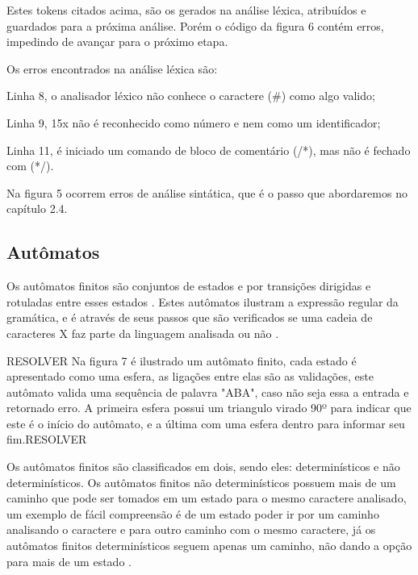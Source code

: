 \documentclass[12pt,oneside,a4paper,chapter=TITLE,section=TITLE,sumario=tradicional]{abntex2}
\begin{document}
Estes tokens citados acima, são os gerados na análise léxica, atribuídos e guardados para a próxima análise. Porém o código da figura 6 contém erros, impedindo de avançar para o próximo etapa.

Os erros encontrados na análise léxica são:

\begin{lista}
	\item Linha 8, o analisador léxico não conhece o caractere (\#) como algo valido;
	\item Linha 9, 15x não é reconhecido como número e nem como um identificador;
	\item Linha 11, é iniciado um comando de bloco de comentário (/*), mas não é fechado com (*/).
\end{lista}

Na figura 5 ocorrem erros de análise sintática, que é o passo que abordaremos no capítulo 2.4.

\subsection{Autômatos}
\label{sec:automatos}

Os autômatos finitos são conjuntos de estados e por transições dirigidas e rotuladas entre esses estados \cite{pedro2018}. Estes autômatos ilustram a expressão regular da gramática, e é através de seus passos que são verificados se uma cadeia de caracteres X faz parte da linguagem analisada ou não \cite{alfred1995}.

RESOLVER
Na figura 7 é ilustrado um autômato finito, cada estado é apresentado como uma esfera, as ligações entre elas são as validações, este autômato valida uma sequência de palavra "ABA", caso não seja essa a entrada e retornado erro. A primeira esfera possui um triangulo virado 90º para indicar que este é o início do autômato, e a última com uma esfera dentro para informar seu fim.RESOLVER

\begin{figure}[htb]
\end{figure}

Os autômatos finitos são classificados em dois, sendo eles: determinísticos e não determinísticos. Os autômatos finitos não determinísticos possuem mais de um caminho que pode ser tomados em um estado para o mesmo caractere analisado, um exemplo de fácil compreensão é de um estado poder ir por um caminho analisando o caractere e para outro caminho com o mesmo caractere, já os autômatos finitos determinísticos seguem apenas um caminho, não dando a opção para mais de um estado \cite{alfred1995}.
\end{document}
